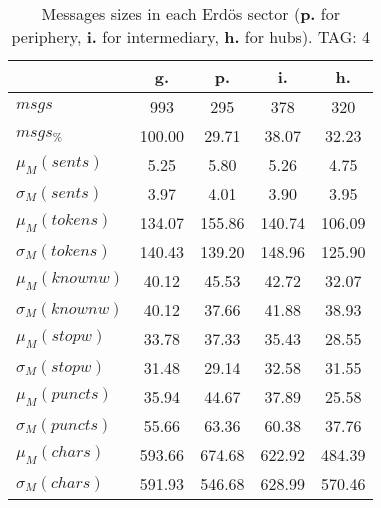\begin{table}[h!]
\begin{center}
\begin{tabular}{| l || c | c | c | c |}\hline
 & {\bf g.} & {\bf p.} & {\bf i.} & {\bf h.} \\\hline\hline
$msgs$ & 993  & 295  & 378  & 320 \\
$msgs_{\%}$ & 100.00  & 29.71  & 38.07  & 32.23 \\\hline
$\mu_M(sents)$ & 5.25  & 5.80  & 5.26  & 4.75 \\
$\sigma_M(sents)$ & 3.97  & 4.01  & 3.90  & 3.95 \\\hline
$\mu_M(tokens)$ & 134.07  & 155.86  & 140.74  & 106.09 \\
$\sigma_M(tokens)$ & 140.43  & 139.20  & 148.96  & 125.90 \\\hline
$\mu_M(knownw)$ & 40.12  & 45.53  & 42.72  & 32.07 \\
$\sigma_M(knownw)$ & 40.12  & 37.66  & 41.88  & 38.93 \\\hline
$\mu_M(stopw)$ & 33.78  & 37.33  & 35.43  & 28.55 \\
$\sigma_M(stopw)$ & 31.48  & 29.14  & 32.58  & 31.55 \\\hline
$\mu_M(puncts)$ & 35.94  & 44.67  & 37.89  & 25.58 \\
$\sigma_M(puncts)$ & 55.66  & 63.36  & 60.38  & 37.76 \\\hline
$\mu_M(chars)$ & 593.66  & 674.68  & 622.92  & 484.39 \\
$\sigma_M(chars)$ & 591.93  & 546.68  & 628.99  & 570.46 \\\hline
\end{tabular}
\caption{Messages sizes in each Erd\"os sector ({{\bf p.}} for periphery, {{\bf i.}} for intermediary, {{\bf h.}} for hubs). TAG: 4}
\end{center}
\end{table}